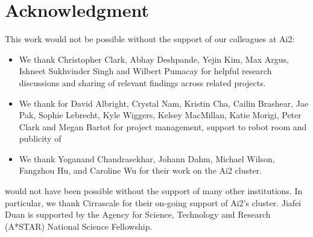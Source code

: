 \section*{Acknowledgment}

This work would not be possible without the support of our colleagues at Ai2:

\begin{itemize}
    \item We thank Christopher Clark, Abhay Deshpande, Yejin Kim, Max Argus, Ishneet Sukhvinder Singh and Wilbert Pumacay for helpful research discussions and sharing of relevant findings across related projects.
    \item We thank for David Albright, Crystal Nam, Kristin Cha, Cailin Brashear, Jae Pak, Sophie Lebrecht, Kyle Wiggers, Kelsey MacMillan, Katie Morigi, Peter Clark and Megan Bartot for project management, support to robot room and publicity of \molmoactt
    \item We thank Yoganand Chandrasekhar, Johann Dahm, Michael Wilson, Fangzhou Hu, and Caroline Wu for their work on the Ai2 cluster.

\end{itemize}

\molmoactt would not have been possible without the support of many other institutions. In particular, we thank Cirrascale for their
on-going support of Ai2’s cluster. Jiafei Duan is supported by the Agency for Science, Technology and Research (A*STAR) National
Science Fellowship.
